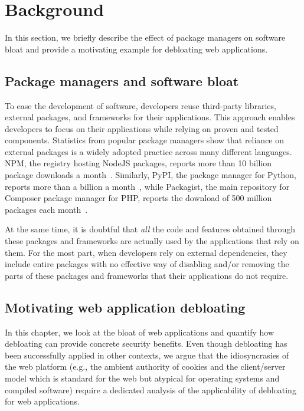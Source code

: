 \section{Background}
\label{sec:background}

In this section, we briefly describe the effect of package managers on software
bloat and provide a motivating example for debloating web applications.


\subsection{Package managers and software bloat}
To ease the development of software, developers reuse third-party libraries,
external packages, and frameworks for their applications. This approach
enables developers to focus on their applications while relying on
proven and tested components. Statistics from popular package managers show
that reliance on external packages is a widely adopted practice across
many different languages. NPM, the registry hosting NodeJS packages,
reports more than 10 billion package downloads a
month~\cite{nodeDownloads}. Similarly, PyPI, the package manager for Python,
reports more than a billion a month~\cite{pypiDownloads}, while Packagist, the main repository for
Composer package manager for PHP, reports the download of 500 million
packages each month~\cite{packagistDownloads}.

At the same time, it is doubtful that \emph{all} the code and features
obtained through these packages and frameworks are actually used by
the applications that rely on them. For the most part, when developers rely on
external dependencies, they include entire packages with no effective way of
disabling and/or removing the parts of these packages and frameworks that
their applications do not require.

\subsection{Motivating web application debloating}

In this chapter, we look at the bloat of web applications and quantify how
debloating can provide concrete security benefits. Even
though debloating has been successfully applied in other contexts, we argue
that the
idiosyncrasies of the web platform (e.g., the ambient authority of cookies and
the client/server model which is standard for the web but atypical
for operating systems and compiled software) require a dedicated analysis
of the applicability of debloating for web applications.

